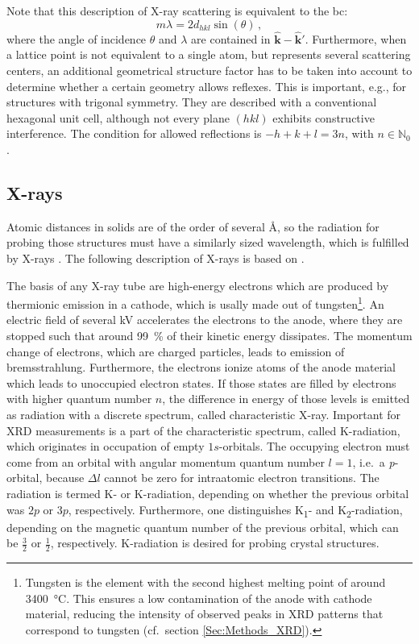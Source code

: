 Note that this description of X-ray scattering is equivalent to the \gls{bc}:
\begin{equation}\label{Equ:Theory_BraggCondition}
    m\lambda=2d_{hkl}\sin(\theta)\,,
\end{equation}
where the angle of incidence $\theta$ and $\lambda$ are contained in $\hat{\mathbf{k}}-\hat{\mathbf{k}}'$.
Furthermore, when a lattice point is not equivalent to a single atom, but represents several scattering centers, an additional geometrical structure factor has to be taken into account to determine whether a certain geometry allows reflexes.
This is important, e.g., for structures with trigonal symmetry. 
They are described with a conventional hexagonal unit cell, although not every plane $(hkl)$ exhibits constructive interference.
The condition for allowed reflections is $-h+k+l=3n$, with $n\in\mathbb{N}_0$ \cite{grundmann2021}.

\subsection{X-rays}\label{Sec:Theory_XRays}
Atomic distances in solids are of the order of several \si{\angstrom}, so the radiation for probing those structures must have a similarly sized wavelength, which is fulfilled by X-rays
    \cite{harrington2021}.
The following description of X-rays is based on \textcite{spiess2009}.

The basis of any X-ray tube are high-energy electrons which are produced by thermionic emission in a cathode, which is usally made out of tungsten\footnote{
    Tungsten is the element with the second highest melting point of around \qty{3400}{\celsius}.
    This ensures a low contamination of the anode with cathode material, reducing the intensity of observed peaks in \gls{XRD} patterns that correspond to tungsten (cf.\  section \ref{Sec:Methods_XRD}). 
}.
An electric field of several \si{\kV} accelerates the electrons to the anode, where they are stopped such that around \qty{99}{\percent} of their kinetic energy dissipates.
The momentum change of electrons, which are charged particles, leads to emission of bremsstrahlung.
Furthermore, the electrons ionize atoms of the anode material which leads to unoccupied electron states.
If those states are filled by electrons with higher quantum number $n$, the difference in energy of those levels is emitted as radiation with a discrete spectrum, called characteristic X-ray.
Important for \gls{XRD} measurements is a part of the characteristic spectrum, called K-radiation, which originates in occupation of empty $1s$-orbitals.
The occupying electron must come from an orbital with angular momentum quantum number $l=1$, i.e.\ a \textit{p}-orbital, because $\Delta l$ cannot be zero for intraatomic electron transitions.
The radiation is termed K\textalpha- or K\textbeta-radiation, depending on whether the previous orbital was $2p$ or $3p$, respectively.
Furthermore, one distinguishes K\textalpha\textsubscript{1}- and K\textalpha\textsubscript{2}-radiation, depending on the magnetic quantum number of the previous orbital, which can be $\frac{3}{2}$ or $\frac{1}{2}$, respectively.
K\textalpha-radiation is desired for probing crystal structures.